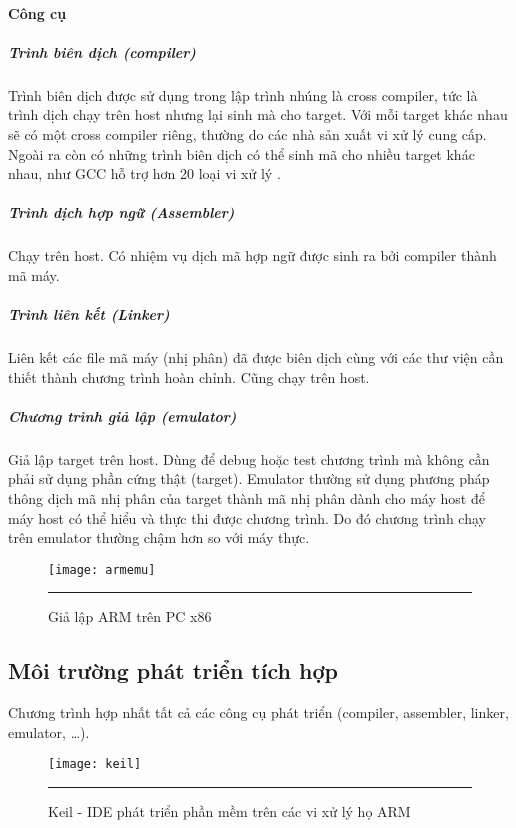         \paragraph{Công cụ}
            \subparagraph{Trình biên dịch (compiler)}
                Trình biên dịch được sử dụng trong lập trình nhúng là cross
                compiler, tức là trình dịch chạy trên host nhưng lại sinh mà
                cho target. Với mỗi target khác nhau sẽ có một cross compiler
                riêng, thường do các nhà sản xuất vi xử lý cung cấp. Ngoài ra
                còn có những trình biên dịch có thể sinh mã cho nhiều target
                khác nhau, như GCC hỗ trợ hơn 20 loại vi xử lý \cite{GccWiki}.

            \subparagraph{Trình dịch hợp ngữ (Assembler)}
                Chạy trên host. Có nhiệm vụ dịch mã hợp ngữ được sinh ra bởi
                compiler thành mã máy.

            \subparagraph{Trình liên kết (Linker)}
                Liên kết các file mã máy (nhị phân) đã được biên dịch cùng với
                các thư viện cần thiết thành chương trình hoàn chỉnh. Cũng chạy
                trên host.

            \subparagraph{Chương trình giả lập (emulator)}
                Giả lập target trên host. Dùng để debug hoặc test chương trình
                mà không cần phải sử dụng phần cứng thật (target). Emulator
                thường sử dụng phương pháp thông dịch mã nhị phân của target thành mã
                nhị phân dành cho máy host để máy host có thể hiểu và thực thi
                được chương trình. Do đó chương trình chạy trên emulator thường
                chậm hơn so với máy thực.


                \begin{figure}[H]
                    \centering
                    \texttt{[image: armemu]}
                    \rule{35em}{0.5pt}
                    \caption{Giả lập ARM trên PC x86}
                    \label{fig:armemu}
                \end{figure}

            \subsection{Môi trường phát triển tích hợp}
                Chương trình hợp nhất tất cả các công cụ phát triển (compiler, assembler,
                linker, emulator, \ldots).
                

                \begin{figure}[H]
                    \centering
                    \texttt{[image: keil]}
                    \rule{35em}{0.5pt}
                    \caption{Keil - IDE phát triển phần mềm trên các vi xử lý họ ARM}
                    \label{fig:keil}
                \end{figure}

